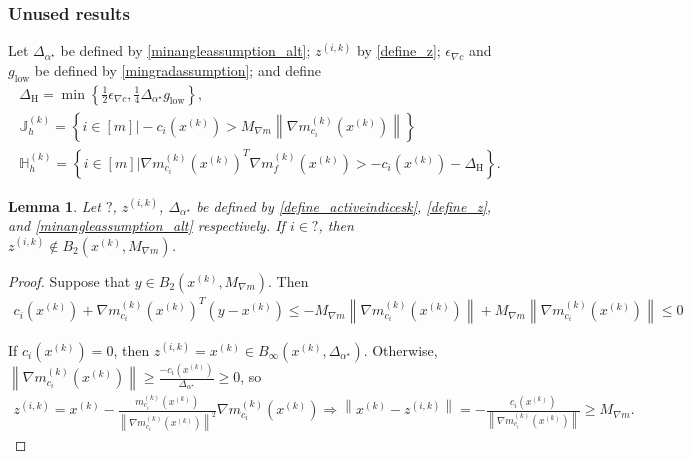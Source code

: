 \documentclass{article}
\newtheorem{lemma}[theorem]{Lemma}
\theoremstyle{case}
\numberwithin{theorem}{subsection}
\newcommand{\gk}{{\nabla m_f^{(k)}\left(\xk\right)}}
\newcommand{\gmcik}{{\nabla m_{c_i}^{(k)}\left(\xk\right)}}
\newcommand{\minangledelta}{{\Delta_{\alpha^{\star}}}}
\newcommand{\mingradepsilon}{{\epsilon_{\nabla c}}}
\newcommand{\mingrad}{{ g_{\textrm{low}} }}
\newcommand{\xk}{x^{(k)}}
\newcommand{\zik}{{z^{(i, k)}}}
\newcommand{\maxmodelgrad}{{M_{\nabla m}}}
\newcommand{\huffindicesk}{{ \mathbb H_h^{(k)} }}
\newcommand{\inactiveindicesk}{{ \mathbb J_h^{(k)} }}
\newcommand{\huffthreshold}{{\Delta_{\textrm{H}}}}
\begin{document}
\subsubsection{Unused results}




Let $\minangledelta$ be defined by \cref{minangleassumption_alt}; $\zik$ by \cref{define_z}; $\mingradepsilon$ and $\mingrad$ be defined by \cref{mingradassumption};
and define
\begin{align}
\huffthreshold = \min\left\{\frac 1 2 \mingradepsilon, \frac 1 4 \minangledelta \mingrad \right\}, \label{define_huffthreshold} \\
\inactiveindicesk = \left\{i \in [m] \bigg| -c_i\left(\xk\right) > \maxmodelgrad \left\|\gmcik\right\| \right\} \label{define_inactiveindicesk} \\
\huffindicesk = \left\{i \in [m] \bigg| \gmcik^T\gk > -c_i\left(\xk\right) - \huffthreshold\right\}. \label{define_huffindicesk}
\end{align}




\begin{lemma}
\label{sayingwhatdoesntneedtobesaidagain}
Let $?$, $\zik$, $\minangledelta$ be defined by \cref{define_activeindicesk}, \cref{define_z}, and \cref{minangleassumption_alt} respectively.
If $i \in ?$, then $\zik \not \in B_{2}\left(\xk, \maxmodelgrad \right)$.
\end{lemma}
\begin{proof}

Suppose that $y \in B_{2}\left(\xk, \maxmodelgrad\right)$.
Then 
\begin{align*}
c_i\left(\xk\right) + \gmcik^T\left(y - \xk\right) \le - \maxmodelgrad \left\|\gmcik\right\| + \maxmodelgrad \left\|\gmcik\right\| \le 0
\end{align*}


If $c_i\left(\xk\right) = 0$, then $\zik = \xk \in B_{\infty}\left(\xk, \minangledelta \right)$.
Otherwise, $\left\|\gmcik\right\| \ge \frac{-c_i\left(\xk\right)}{\minangledelta} \ge 0$, so
\begin{align*}
\zik = \xk - \frac{m^{(k)}_{c_i}\left(\xk\right)}{\left\|\gmcik\right\|^2} \gmcik 
\Longrightarrow \left\|\xk - \zik \right\|= -\frac{c_i\left(\xk\right)}{\left\|\gmcik\right\|} \ge \maxmodelgrad.
\end{align*}
\end{proof}
\end{document}

